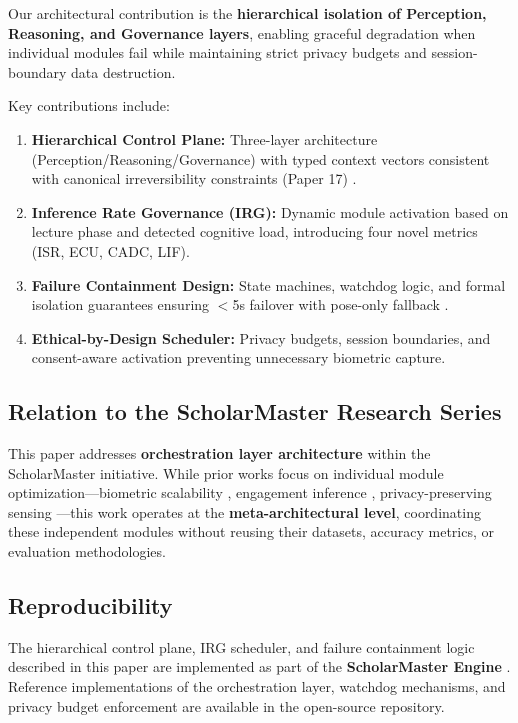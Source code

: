 \documentclass[conference]{IEEEtran}
\begin{document}
Our architectural contribution is the \textbf{hierarchical isolation of Perception, Reasoning, and Governance layers}, enabling graceful degradation when individual modules fail while maintaining strict privacy budgets and session-boundary data destruction.

Key contributions include:
\begin{enumerate}
    \item \textbf{Hierarchical Control Plane:} Three-layer architecture (Perception/Reasoning/Governance) with typed context vectors consistent with canonical irreversibility constraints (Paper 17) \cite{b17}. 
    \item \textbf{Inference Rate Governance (IRG):} Dynamic module activation based on lecture phase and detected cognitive load, introducing four novel metrics (ISR, ECU, CADC, LIF).
    \item \textbf{Failure Containment Design:} State machines, watchdog logic, and formal isolation guarantees ensuring $<$5s failover with pose-only fallback \cite{b18}.
    \item \textbf{Ethical-by-Design Scheduler:} Privacy budgets, session boundaries, and consent-aware activation preventing unnecessary biometric capture.
\end{enumerate}

\subsection{Relation to the ScholarMaster Research Series}
This paper addresses \textbf{orchestration layer architecture} within the ScholarMaster initiative. While prior works focus on individual module optimization---biometric scalability \cite{b1}, engagement inference \cite{b2}, privacy-preserving sensing \cite{b3}---this work operates at the \textbf{meta-architectural level}, coordinating these independent modules without reusing their datasets, accuracy metrics, or evaluation methodologies.

\subsection{Reproducibility}
The hierarchical control plane, IRG scheduler, and failure containment logic described in this paper are implemented as part of the \textbf{ScholarMaster Engine} \cite{scholarmaster_repo}. Reference implementations of the orchestration layer, watchdog mechanisms, and privacy budget enforcement are available in the open-source repository.
\end{document}
